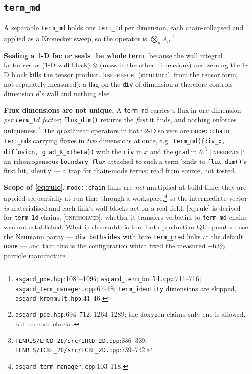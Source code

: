\documentclass[10pt]{article}
\newcommand{\code}[1]{\texttt{#1}}
\newcommand{\INF}{\textcolor{red!60!black}{\textsc{[inference]}}}
\newcommand{\UNR}{\textcolor{red!60!black}{\textsc{[unresolved]}}}
\newcommand{\fl}[2]{\texttt{#1}:#2}
\begin{document}
\subsection{\code{term\_md}}
\label{sec:md}

A separable \code{term\_md} holds one \code{term\_1d} per dimension, each
chain-collapsed and applied as a Kronecker sweep, so the operator is $\bigotimes_d
A_d$.\footnote{\fl{asgard\_pde.hpp}{1081--1096};
\fl{asgard\_term\_build.cpp}{711--716}; \fl{asgard\_term\_manager.cpp}{67--68};
\code{term\_identity} dimensions are skipped, \fl{asgard\_kronmult.hpp}{41--46}.}

\textbf{Sealing a 1-D factor seals the whole term}, because the wall integral
factorises as (1-D wall block) $\otimes$ (mass in the other dimensions) and
zeroing the 1-D block kills the tensor product. \INF{} (structural, from the
tensor form, not separately measured): a flag on the \code{div} of dimension $d$
therefore controls dimension $d$'s wall and nothing else.

\textbf{Flux dimensions are not unique.} A \code{term\_md} carries a flux in one
dimension \emph{per \code{term\_1d} factor}; \code{flux\_dim()} returns the
\emph{first} it finds, and nothing enforces
uniqueness.\footnote{\fl{asgard\_pde.hpp}{694--712, 1264--1289}; the doxygen
claims only one is allowed, but no code checks.} The quasilinear operators in
both 2-D solvers are \code{mode::chain} \code{term\_md}s carrying fluxes in
\emph{two} dimensions at once, e.g.\
\code{term\_md(\{div\_x, diffusion, grad\_K\_xtheta\})} with the \code{div} in
$x$ and the \code{grad} in
$\theta$.\footnote{\code{FENRIS/LHCD\_2D/src/LHCD\_2D.cpp}:336--339;
\code{FENRIS/ICRF\_2D/src/ICRF\_2D.cpp}:739--742.} \INF{}: an inhomogeneous
\code{boundary\_flux} attached to such a term binds to \code{flux\_dim()}'s first
hit, silently --- a trap for chain-mode terms; read from source, not tested.

\textbf{Scope of \eqref{eq:rule}.} \code{mode::chain} links are \emph{not}
multiplied at build time; they are applied sequentially at run time through a
workspace,\footnote{\fl{asgard\_term\_manager.cpp}{103--118}.} so the intermediate
vector \emph{is} materialised and each link's wall blocks act on a real field.
\eqref{eq:rule} is derived for \code{term\_1d} chains. \UNR{}: whether it
transfers verbatim to \code{term\_md} chains was not established. What is
observable is that both production QL operators use the Neumann parity ---
\code{div bothsides} with bare \code{term\_grad} links at the default
\code{none} --- and that this is the configuration which fixed the measured
$+63\%$ particle manufacture.
\end{document}
